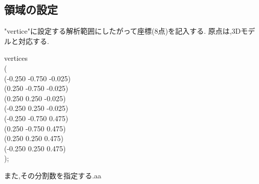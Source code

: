 \documentclass[a4paper]{jsarticle}
\begin{document}
\subsection{領域の設定}
"vertice"に設定する解析範囲にしたがって座標(8点)を記入する.
原点は,3Dモデルと対応する.
\begin{framed}
    \begin{center}
        {
            vertices\\
            (\\
            \qquad (-0.250 -0.750 -0.025)\\
            \qquad (0.250 -0.750 -0.025)\\
            \qquad (0.250 0.250 -0.025)\\
            \qquad (-0.250 0.250 -0.025)\\
            \qquad (-0.250 -0.750 0.475)\\
            \qquad (0.250 -0.750 0.475)\\
            \qquad (0.250 0.250 0.475)\\
            \qquad (-0.250 0.250 0.475)\\
            );
        }
    \end{center}
\end{framed}

また,その分割数を指定する.aa
\end{document}

